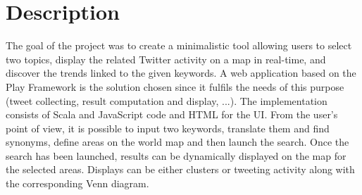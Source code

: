 \section{Description}

The goal of the project was to create a minimalistic tool allowing users to select two topics, display the related Twitter activity on a map in real-time, and discover the trends linked to the given keywords. 
A web application based on the Play Framework \cite{play} is the solution chosen since it fulfils the needs of this purpose (tweet collecting, result computation and display, ...). The implementation consists of Scala and JavaScript code and HTML for the UI.
From the user's point of view, it is possible to input two keywords, translate them and find synonyms, define areas on the world map and then launch the search. Once the search has been launched, results can be dynamically displayed on the map for the selected areas. Displays can be either clusters or tweeting activity along with the corresponding Venn diagram.

